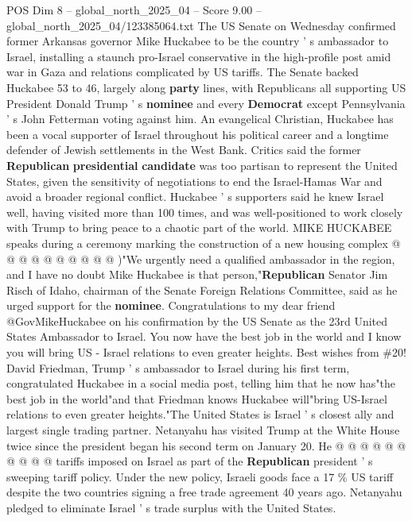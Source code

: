 \begin{textsample}{POS Dim 8 – global\_north\_2025\_04 – Score 9.00 – global\_north\_2025\_04/123385064.txt}  \label{ex:f8_pos_370}
The US Senate on Wednesday confirmed former Arkansas governor Mike Huckabee to be the country ' s ambassador to Israel, installing a staunch pro-Israel conservative in the high-profile post amid war in Gaza and relations complicated by US tariffs.
The Senate backed Huckabee 53 to 46, largely along \textbf{party} lines, with Republicans all supporting US President Donald Trump ' s \textbf{nominee} and every \textbf{Democrat} except Pennsylvania ' s John Fetterman voting against him.
An evangelical Christian, Huckabee has been a vocal supporter of Israel throughout his political career and a longtime defender of Jewish settlements in the West Bank.
Critics said the former \textbf{Republican} \textbf{presidential} \textbf{candidate} was too partisan to represent the United States, given the sensitivity of negotiations to end the Israel-Hamas War and avoid a broader regional conflict.
Huckabee ' s supporters said he knew Israel well, having visited more than 100 times, and was well-positioned to work closely with Trump to bring peace to a chaotic part of the world.
MIKE HUCKABEE speaks during a ceremony marking the construction of a new housing complex @ @ @ @ @ @ @ @ @ @ )"We urgently need a qualified ambassador in the region, and I have no doubt Mike Huckabee is that person,"\textbf{Republican} Senator Jim Risch of Idaho, chairman of the Senate Foreign Relations Committee, said as he urged support for the \textbf{nominee}.
Congratulations to my dear friend @GovMikeHuckabee on his confirmation by the US Senate as the 23rd United States Ambassador to Israel.
You now have the best job in the world and I know you will bring US - Israel relations to even greater heights.
Best wishes from \#20!
David Friedman, Trump ' s ambassador to Israel during his first term, congratulated Huckabee in a social media post, telling him that he now has"the best job in the world"and that Friedman knows Huckabee will"bring US-Israel relations to even greater heights."The United States is Israel ' s closest ally and largest single trading partner.
Netanyahu has visited Trump at the White House twice since the president began his second term on January 20.
He @ @ @ @ @ @ @ @ @ @ tariffs imposed on Israel as part of the \textbf{Republican} president ' s sweeping tariff policy.
Under the new policy, Israeli goods face a 17 \% US tariff despite the two countries signing a free trade agreement 40 years ago.
Netanyahu pledged to eliminate Israel ' s trade surplus with the United States.

\end{textsample}
